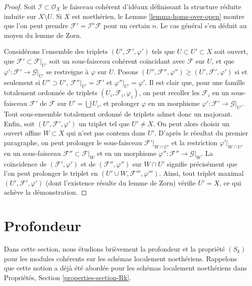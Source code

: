 \begin{proof}
Soit $\mathcal{I} \subset \mathcal{O}_X$ le faisceau cohérent d'idéaux
définissant la structure réduite induite sur $X \setminus U$.
Si $X$ est noethérien, le Lemme \ref{lemma-homs-over-open} montre
que l'on peut prendre $\mathcal{F}' = \mathcal{I}^n\mathcal{F}$
pour un certain $n$. Le cas général s'en déduit au moyen du lemme de Zorn.

\medskip\noindent
Considérons l'ensemble des triplets $(U', \mathcal{F}', \varphi')$ tels que
$U \subset U' \subset X$ soit ouvert, que $\mathcal{F}' \subset \mathcal{F}|_{U'}$
soit un sous-faisceau cohérent coïncidant avec $\mathcal{F}$ sur $U$, et que
$\varphi' : \mathcal{F}' \to \mathcal{G}|_{U'}$ se restreigne à
$\varphi$ sur $U$. Posons
$(U'', \mathcal{F}'', \varphi'') \geq (U', \mathcal{F}', \varphi')$
si et seulement si $U'' \supset U'$, $\mathcal{F}''|_{U'} = \mathcal{F}'$
et $\varphi''|_{U'} = \varphi'$.
Il est clair que, pour une famille totalement ordonnée
de triplets $(U_i, \mathcal{F}_i, \varphi_i)$, on
peut recoller les $\mathcal{F}_i$ en un sous-faisceau $\mathcal{F}'$ de $\mathcal{F}$
sur $U' = \bigcup U_i$, et prolonger $\varphi$ en un morphisme
$\varphi' : \mathcal{F}' \to \mathcal{G}|_{U'}$.
Tout sous-ensemble totalement ordonné de triplets admet donc un majorant.
Enfin, soit $(U', \mathcal{F}', \varphi')$
un triplet tel que $U' \not = X$. On peut alors choisir un
ouvert affine $W \subset X$ qui n'est pas contenu dans $U'$.
D'après le résultat du premier paragraphe, on peut prolonger
le sous-faisceau $\mathcal{F}'|_{W \cap U'}$ et la restriction
$\varphi'|_{W \cap U'}$ en un sous-faisceau $\mathcal{F}'' \subset \mathcal{F}|_W$
et en un morphisme $\varphi'' : \mathcal{F}'' \to \mathcal{G}|_W$.
La coïncidence de $(\mathcal{F}', \varphi')$ et de
$(\mathcal{F}'', \varphi'')$ sur $W \cap U'$ signifie précisément
que l'on peut prolonger le triplet en $(U' \cup W, \mathcal{F}''', \varphi''')$.
Ainsi, tout triplet maximal $(U', \mathcal{F}', \varphi')$
(dont l'existence résulte du lemme de Zorn) vérifie $U' = X$,
ce qui achève la démonstration.
\end{proof}






\section{Profondeur}
\label{section-depth}

\noindent
Dans cette section, nous étudions brièvement la profondeur et la propriété
$(S_k)$ pour les modules cohérents sur les schémas localement noethériens.
Rappelons que cette notion a déjà été abordée pour les schémas localement
noethériens dans Propriétés, Section \ref{properties-section-Rk}.

